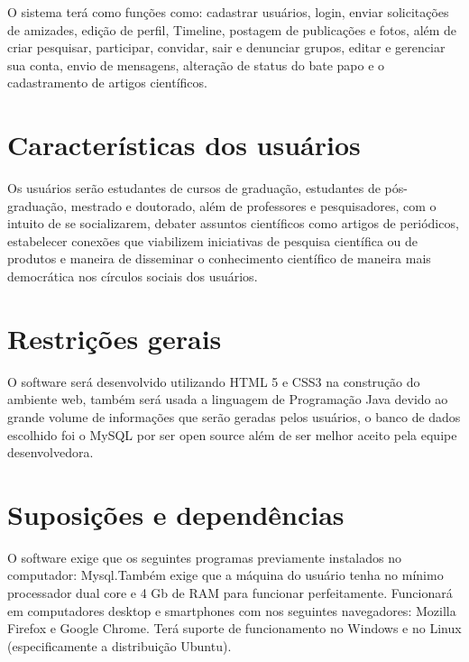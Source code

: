 O sistema terá como funções como: cadastrar usuários, login, enviar solicitações de amizades, edição de perfil, Timeline, postagem de publicações e fotos, além de criar pesquisar, participar, convidar, sair e denunciar grupos, editar e gerenciar sua conta, envio de mensagens, alteração de status do bate papo e o cadastramento de artigos científicos.

\section{Características dos usuários}
Os usuários serão estudantes de cursos de graduação, estudantes de pós-graduação, mestrado e doutorado, além de professores e pesquisadores, com o intuito de se socializarem, debater assuntos científicos como artigos de periódicos, estabelecer conexões que viabilizem iniciativas de pesquisa científica ou de produtos e maneira de disseminar o conhecimento científico de maneira mais democrática nos círculos sociais dos usuários.


\section{Restrições gerais}
O software será desenvolvido utilizando HTML 5 e CSS3 na construção do ambiente web, também será usada a linguagem de Programação Java devido ao grande volume de informações que serão geradas pelos usuários, o banco de dados escolhido foi o MySQL por ser open source além de ser melhor aceito pela equipe desenvolvedora.

\section{Suposições e dependências}
O software exige que os seguintes programas previamente instalados no computador: Mysql.Também exige que a máquina do usuário tenha no mínimo processador dual core e 4 Gb de RAM para funcionar perfeitamente. Funcionará em computadores desktop e smartphones com nos seguintes navegadores: Mozilla Firefox e Google Chrome. Terá suporte de funcionamento no Windows e no Linux (especificamente a distribuição Ubuntu).